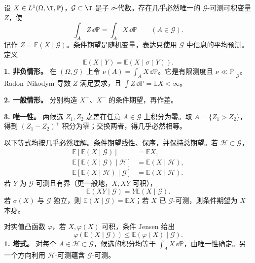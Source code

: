 设 $X\in L^1(\Omega,\T,\mathbb P)$，$\mathcal G\subset\T$ 是子 $\sigma$-代数。存在几乎必然唯一的 $\mathcal G$-可测可积变量 $Z$，使
\[
\int_A Z\,\dd\mathbb P=\int_A X\,\dd\mathbb P
\qquad(A\in\mathcal G).
\]
记作 $Z=\mathbb E(X\mid\mathcal G)$。条件期望是随机变量，表达只使用 $\mathcal G$ 中信息的平均预测。定义
\[
\mathbb E(X\mid Y)=\mathbb E(X\mid\sigma(Y)).
\]
\textbf{1. 非负情形。} 在 $(\Omega,\mathcal G)$ 上令 $\nu(A)=\int_A X\,\dd\mathbb P$。它是有限测度且 $\nu\ll\mathbb P|_{\mathcal G}$。Radon--Nikodym 导数 $Z$ 满足要求，且 $\int Z\,\dd\mathbb P=\mathbb EX<\infty$。

\textbf{2. 一般情形。} 分别构造 $X^+$、$X^-$ 的条件期望，再作差。

\textbf{3. 唯一性。} 两候选 $Z_1,Z_2$ 之差在任意 $A\in\mathcal G$ 上积分为零。取 $A=\{Z_1>Z_2\}$，得到 $(Z_1-Z_2)^+$ 积分为零；交换两者，得几乎必然相等。

以下等式均按几乎必然理解。条件期望线性、保序，并保持总期望。若 $\mathcal H\subset\mathcal G$，
\[
\begin{aligned}
\mathbb E[\mathbb E(X\mid\mathcal G)]&=\mathbb EX,\\
\mathbb E[\mathbb E(X\mid\mathcal G)\mid\mathcal H]
&=\mathbb E(X\mid\mathcal H),\\
\mathbb E[\mathbb E(X\mid\mathcal H)\mid\mathcal G]
&=\mathbb E(X\mid\mathcal H).
\end{aligned}
\]
若 $Y$ 为 $\mathcal G$-可测且有界（更一般地，$X,XY$ 可积），
\[
\mathbb E(XY\mid\mathcal G)=Y\mathbb E(X\mid\mathcal G).
\]
若 $\sigma(X)$ 与 $\mathcal G$ 独立，则 $\mathbb E(X\mid\mathcal G)=\mathbb EX$；若 $X$ 已 $\mathcal G$-可测，则条件期望为 $X$ 本身。

对实值凸函数 $\varphi$，若 $X,\varphi(X)$ 可积，条件 Jensen 给出
\[
\varphi(\mathbb E(X\mid\mathcal G))
\le\mathbb E(\varphi(X)\mid\mathcal G).
\]
\textbf{1. 塔式。} 对每个 $A\in\mathcal H\subset\mathcal G$，候选的积分均等于 $\int_A X\,\dd\mathbb P$，由唯一性确定。另一个方向利用 $\mathcal H$-可测蕴含 $\mathcal G$-可测。

